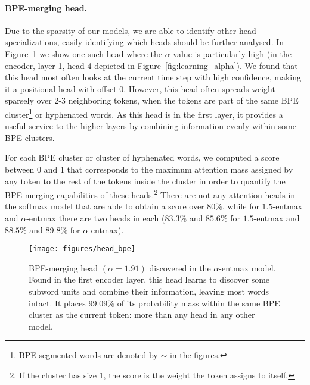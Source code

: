 \documentclass[11pt,a4paper]{article}
\newcommand{\figref}[1]{Figure~\ref{fig:#1}}
\newcommand*\entmaxtext{entmax\xspace}
\begin{document}
\paragraph{BPE-merging head.}
Due to the sparsity of our models, we are able to identify other head
specializations, easily identifying which heads should be further analysed.
In \figref{head_bpe} we show one such head where the $\alpha$ value
is particularly high (in the encoder, layer 1, head 4 depicted in
\figref{learning_alpha}). We found that this head most often looks at
the current time step with high confidence, making it a positional head
with offset $0$. However, this head often spreads weight sparsely
over 2-3 neighboring tokens, when the tokens are part of the same BPE
cluster\footnote{BPE-segmented words are denoted by $\sim$ in the
figures.} or hyphenated words. As this head is in the first layer, it
provides a useful service to the higher layers by combining
information evenly within some BPE clusters.

For each BPE cluster or cluster of hyphenated words,
we computed a score between 0 and 1 that corresponds to the
maximum attention mass assigned by any token to the rest of the
tokens inside the cluster in order to quantify the BPE-merging
capabilities of these heads.\footnote{If the
cluster has size 1, the score is the weight the token assigns to
itself.} There are not any attention heads in
the softmax model that are able to obtain a score over $80\%$, while
for $1.5$-\entmaxtext and $\alpha$-\entmaxtext there are two heads
in each ($83.3\%$ and $85.6\%$ for $1.5$-\entmaxtext and $88.5\%$ and
$89.8\%$ for $\alpha$-\entmaxtext).

\begin{figure}[t]
    \centering
    \texttt{[image: figures/head\_bpe]}
    \caption{BPE-merging head $(\alpha=1.91)$ discovered in the
    $\alpha$-\entmaxtext model. Found in the first encoder layer,
    this head learns to discover some subword units and combine their
    information, leaving most words intact. It places $99.09\%$ of
    its probability mass within the same BPE cluster as the current
    token: more than any head in any other model.}
    \label{fig:head_bpe}
\end{figure}
\end{document}
